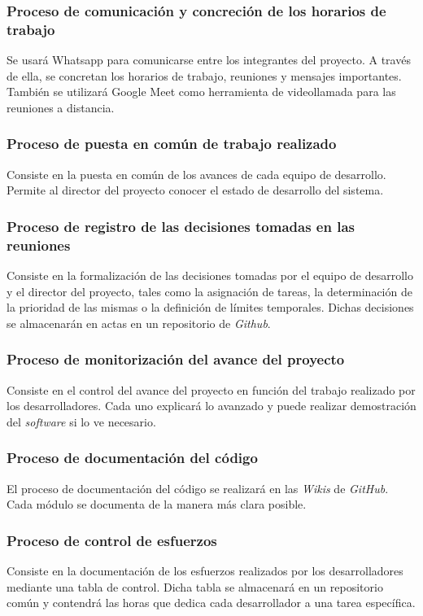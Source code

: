 \documentclass{article}
\begin{document}
\subsubsection{Proceso de comunicación y concreción de los horarios de trabajo} \label{P.EC.1}
Se usará Whatsapp para comunicarse entre los integrantes del proyecto. A través de ella, se concretan los horarios de trabajo, reuniones y mensajes importantes. También se utilizará Google Meet como herramienta de videollamada para las reuniones a distancia. 

\subsubsection{Proceso de puesta en común de trabajo realizado} \label{P.EC.2}
Consiste en la puesta en común de los avances de cada equipo de desarrollo. Permite al director del proyecto conocer el estado de desarrollo del sistema.

\subsubsection{Proceso de registro de las decisiones tomadas en las reuniones} \label{P.EC.3}
Consiste en la formalización de las decisiones tomadas por el equipo de desarrollo y el director del proyecto, tales como la asignación de tareas, la determinación de la prioridad de las mismas o la definición de límites temporales. Dichas decisiones se almacenarán en actas en un repositorio de \textit{Github}.

\subsubsection{Proceso de monitorización del avance del proyecto} \label{P.EC.4}
Consiste en el control del avance del proyecto en función del trabajo realizado por los desarrolladores. Cada uno explicará lo avanzado y puede realizar demostración del \textit{software} si lo ve necesario.

\subsubsection{Proceso de documentación del código} \label{P.EC.5}
El proceso de documentación del código se realizará en las \textit{Wikis} de \textit{GitHub}. Cada módulo se documenta de la manera más clara posible.

\subsubsection{Proceso de control de esfuerzos} \label{P.EC.6}
Consiste en la documentación de los esfuerzos realizados por los desarrolladores mediante una tabla de control. Dicha tabla se almacenará en un repositorio común y contendrá las horas que dedica cada desarrollador a una tarea específica.
\end{document}
